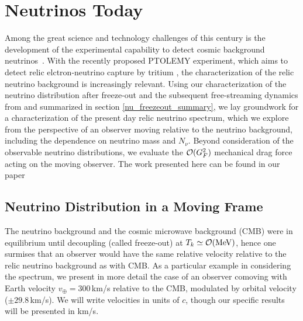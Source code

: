 \chapter{Neutrinos Today}\label{ch:nu_today}
Among the great science and technology challenges of this century is the development of the experimental capability to detect cosmic background neutrinos~\cite{Stodolsky:1975,Cabibbo:1982,Shvartsman,Langacker:1982,Smith,Ferreras:1995wf,Hagmann:1999kf,Duda:2001hd,Gelmini,Ringwald:2009,Liao:2012,Hedman}. With the  recently proposed PTOLEMY experiment, which aims to detect relic  elctron-neutrino capture by tritium \cite{PTOLEMY}, the characterization of the relic neutrino background is increasingly relevant.  Using our  characterization of the neutrino distribution after freeze-out and the subsequent free-streaming dynamics from \cite{Birrell:2013_2} and summarized in section \ref{nu_freezeout_summary}, we lay groundwork for a characterization of the present day relic neutrino spectrum, which we explore  from the  perspective of an observer moving relative to the neutrino background, including the dependence on neutrino mass and $N_\nu$. Beyond consideration of the observable neutrino distributions, we evaluate the ${\cal O}(G_F^2)$ mechanical drag force acting on the moving observer.  The work presented here can be found in our paper \cite{nu_today}

\section{Neutrino Distribution in a Moving Frame}

The neutrino background and the cosmic microwave background (CMB) were in equilibrium until decoupling (called freeze-out) at $T_k\simeq {\cal O}{\rm (MeV)}$, hence one surmises that an observer would have the same relative velocity relative to the relic neutrino background  as with CMB. As a particular example in considering the spectrum, we present in more detail the case of an observer comoving with  Earth velocity $v_\oplus=300$\,km/s relative to the CMB,  modulated by orbital velocity ($\pm29.8$\,km/s).  We will write velocities in units of $c$, though our specific results will be presented in km/s.

